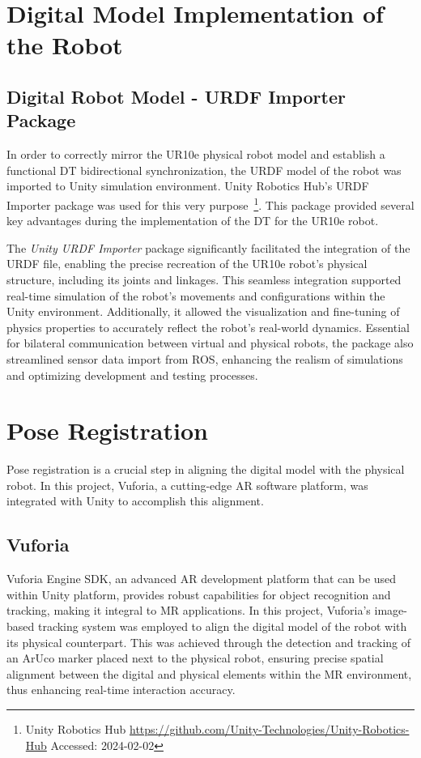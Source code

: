 \section{Digital Model Implementation of the Robot}
\label{section:digital-model}

\subsection{Digital Robot Model - URDF Importer Package}
In order to correctly mirror the UR10e physical robot model and establish a functional \ac{DT} bidirectional synchronization, the \ac{URDF} model of the robot was imported to Unity simulation environment. Unity Robotics Hub's \ac{URDF} Importer package was used for this very purpose~\footnote{Unity Robotics Hub \url{https://github.com/Unity-Technologies/Unity-Robotics-Hub} Accessed: 2024-02-02}.
This package provided several key advantages during the implementation of the \ac{DT} for the UR10e robot.

The \textit{Unity \ac{URDF} Importer} package significantly facilitated the integration of the \ac{URDF} file, enabling the precise recreation of the UR10e robot's physical structure, including its joints and linkages. This seamless integration supported real-time simulation of the robot's movements and configurations within the \ac{Unity} environment. Additionally, it allowed the visualization and fine-tuning of physics properties to accurately reflect the robot's real-world dynamics. Essential for bilateral communication between virtual and physical robots, the package also streamlined sensor data import from \ac{ROS}, enhancing the realism of simulations and optimizing development and testing processes.

\section{Pose Registration}
Pose registration is a crucial step in aligning the digital model with the physical robot. In this project, Vuforia, a cutting-edge \ac{AR} software platform, was integrated with Unity to accomplish this alignment.

\subsection{Vuforia}
\label{section:marker-detection}

Vuforia Engine \ac{SDK}, an advanced \ac{AR} development platform that can be used within Unity platform, provides robust capabilities for object recognition and tracking, making it integral to \ac{MR} applications. In this project, Vuforia's image-based tracking system was employed to align the digital model of the robot with its physical counterpart. This was achieved through the detection and tracking of an ArUco marker placed next to the physical robot, ensuring precise spatial alignment between the digital and physical elements within the \ac{MR} environment, thus enhancing real-time interaction accuracy.



